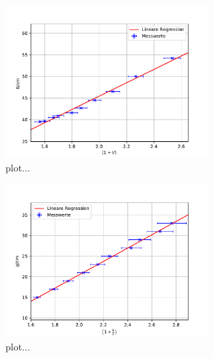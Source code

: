 \begin{figure}
  \centering
  \includegraphics[width = 0.7\textwidth]{../Messdaten/plots/abbe_plot_b.pdf}
  \caption{plot...} %
  \label{fig: abbe_b}
\end{figure}

\begin{figure}
  \centering
  \includegraphics[width = 0.7\textwidth]{../Messdaten/plots/abbe_plot_g.pdf}
  \caption{plot...} %
  \label{fig: abbe_g}
\end{figure}


